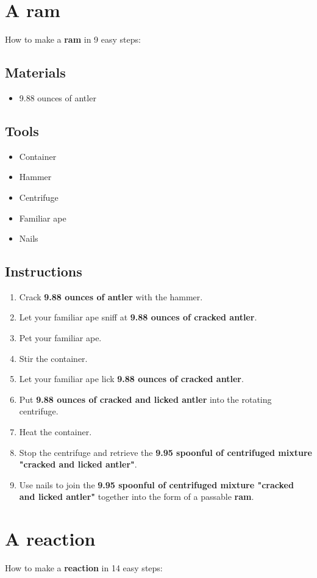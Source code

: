 \documentclass{article}
\begin{document}
\section{A ram}How to make a \textbf{ram} in 9 easy steps:

\subsection{Materials}\begin{itemize}
\item 
9.88 ounces of antler
\end{itemize}
\subsection{Tools}\begin{itemize}
\item 
Container
\item 
Hammer
\item 
Centrifuge
\item 
Familiar ape
\item 
Nails
\end{itemize}
\subsection{Instructions}\begin{enumerate}
\item 
Crack \textbf{9.88 ounces of antler} with the hammer.
\item 
Let your familiar ape sniff at \textbf{9.88 ounces of cracked antler}.
\item 
Pet your familiar ape.
\item 
Stir the container.
\item 
Let your familiar ape lick \textbf{9.88 ounces of cracked antler}.
\item 
Put \textbf{9.88 ounces of cracked and licked antler} into the rotating centrifuge.
\item 
Heat the container.
\item 
Stop the centrifuge and retrieve the \textbf{9.95 spoonful of centrifuged mixture "cracked and licked antler"}.
\item 
Use nails to join the \textbf{9.95 spoonful of centrifuged mixture "cracked and licked antler"} together into the form of a passable \textbf{ram}.
\end{enumerate}
\newpage
\section{A reaction}How to make a \textbf{reaction} in 14 easy steps:
\end{document}

